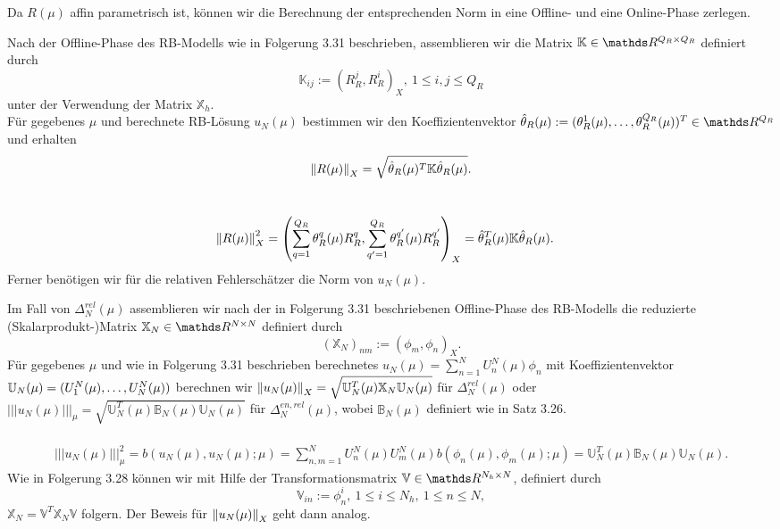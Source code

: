 Da $R(\mu)$ affin parametrisch ist, können wir die Berechnung der entsprechenden Norm in eine Offline- und eine Online-Phase zerlegen.

Nach der Offline-Phase des RB-Modells wie in Folgerung 3.31 beschrieben, assemblieren wir die Matrix $\mathbb{K}\in \R^{Q_R\times Q_R}$ definiert durch
\[
\mathbb{K}_{ij} := (R_R^j,R_R^i)_X,~1\le i,j\le Q_R
\]
unter der Verwendung der Matrix $\mathbb{X}_h$.\\
Für gegebenes $\mu$ und berechnete RB-Lösung $u_N(\mu)$ bestimmen wir den Koeffizientenvektor $\hat{\theta}_R(\mu) := (\theta_R^1(\mu)\dt{,}\theta_R^{Q_R}(\mu))^T\in \R^{Q_R}$ und erhalten
\[
\left\Vert R(\mu)\right\Vert_X = \sqrt{\hat{\theta}_R(\mu)^T\mathbb{K}\hat{\theta}_R(\mu)}.
\]

\\
\begin{align*}
\left\Vert R(\mu)\right\Vert_X^2 &= \left( \sum_{q=1}^{Q_R}\theta_R^q(\mu)R_R^q,\sum_{q'=1}^{Q_R}\theta_R^{q'}(\mu)R_R^{q'} \right)_X = \hat{\theta}_R^T(\mu)\mathbb{K}\hat{\theta}_R(\mu).
\end{align*}
Ferner benötigen wir für die relativen Fehlerschätzer die Norm von $u_N(\mu)$.

Im Fall von $\Delta_N^{rel}(\mu)$ assemblieren wir nach der in Folgerung 3.31 beschriebenen Offline-Phase des RB-Modells die reduzierte (Skalarprodukt-)Matrix $\mathbb{X}_N\in \R^{N\times N}$ definiert durch
\[
(\mathbb{X}_N)_{nm} := (\phi_m,\phi_n)_X.
\]
Für gegebenes $\mu$ und wie in Folgerung 3.31 beschrieben berechnetes $u_N(\mu) = \sum_{n=1}^{N} U_n^N(\mu)\phi_n$ mit Koeffizientenvektor $\mathbb{U}_N(\mu) = (U_1^N(\mu), \dots ,U_N^N(\mu))$ berechnen wir $\left\Vert u_N(\mu)\right\Vert_X = \sqrt{\mathbb{U}_N^T(\mu)\mathbb{X}_N\mathbb{U}_N(\mu)}$ für $\Delta_N^{rel}(\mu)$ oder $|||u_N(\mu)|||_\mu = \sqrt{\mathbb{U}_N^T(\mu)\mathbb{B}_N(\mu)\mathbb{U}_N(\mu)}$ für $\Delta_N^{en,rel}(\mu)$, wobei $\mathbb{B}_N(\mu)$ definiert wie in Satz 3.26.\\

\\
\begin{align*}
|||u_N(\mu)|||_\mu^2 = b(u_N(\mu),u_N(\mu);\mu) = \sum_{n,m=1}^{N} U_n^N(\mu)U_m^N(\mu) b(\phi_n(\mu),\phi_m(\mu);\mu) = \mathbb{U}_N^T(\mu) \mathbb{B}_N(\mu) \mathbb{U}_N(\mu).
\end{align*}
Wie in Folgerung 3.28 können wir mit Hilfe der Transformationsmatrix $\mathbb{V}\in \R^{N_h\times N}$, definiert durch
\[
\mathbb{V}_{in} := \phi_n^i,~1\le i\le N_h,~1\le n\le N,
\]
$\mathbb{X}_N = \mathbb{V}^T\mathbb{X}_N\mathbb{V}$ folgern.
Der Beweis für $\left\Vert u_N(\mu)\right\Vert_X$ geht dann analog.

